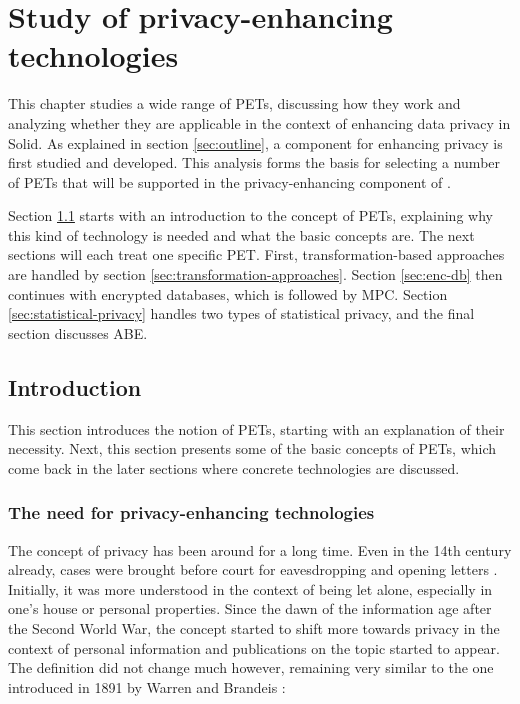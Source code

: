 \chapter{Study of privacy-enhancing technologies}
\label{cha:analysis}
This chapter studies a wide range of \gls{PETs}, discussing how they work and analyzing whether they are applicable in the context of enhancing data privacy in Solid. As explained in section \ref{sec:outline}, a component for enhancing privacy is first studied and developed. This analysis forms the basis for selecting a number of \gls{PETs} that will be supported in the privacy-enhancing component of \middleware{}.

Section \ref{sec:pets} starts with an introduction to the concept of \gls{PETs}, explaining why this kind of technology is needed and what the basic concepts are. The next sections will each treat one specific PET. First, transformation-based approaches are handled by section \ref{sec:transformation-approaches}. Section \ref{sec:enc-db} then continues with encrypted databases, which is followed by \acrlong{MPC}. Section \ref{sec:statistical-privacy} handles two types of statistical privacy, and the final section discusses \acrlong{ABE}.

\section{Introduction}
\label{sec:pets}
This section introduces the notion of \gls{PETs}, starting with an explanation of their necessity. Next, this section presents some of the basic concepts of \gls{PETs}, which come back in the later sections where concrete technologies are discussed.
\subsection{The need for privacy-enhancing technologies}
The concept of privacy has been around for a long time. Even in the 14th century already, cases were brought before court for eavesdropping and opening letters \citep{privacy-history}. Initially, it was more understood in the context of being let alone, especially in one's house or personal properties. Since the dawn of the information age after the Second World War, the concept started to shift more towards privacy in the context of personal information and publications on the topic started to appear. The definition did not change much however, remaining very similar to the one introduced in 1891 by Warren and Brandeis \citep{privacy-history}:

